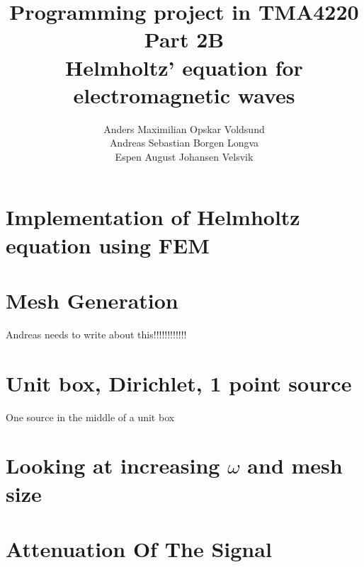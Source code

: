\documentclass[10pt,a4paper]{article}
\begin{document}
\title{Programming project in TMA4220 \\ Part 2B \\ Helmholtz' equation for electromagnetic waves}
\author{Anders Maximilian Opskar Voldsund \\ Andreas Sebastian Borgen Longva \\ Espen August Johansen Velsvik}
\maketitle











\section*{Implementation of Helmholtz equation using FEM}


\section*{Mesh Generation}
Andreas needs to write about this!!!!!!!!!!!!

\section*{Unit box, Dirichlet, 1 point source}
One source in the middle of a unit box



\section*{Looking at increasing $\omega$ and mesh size}



\section*{Attenuation Of The Signal}








\end{document}
